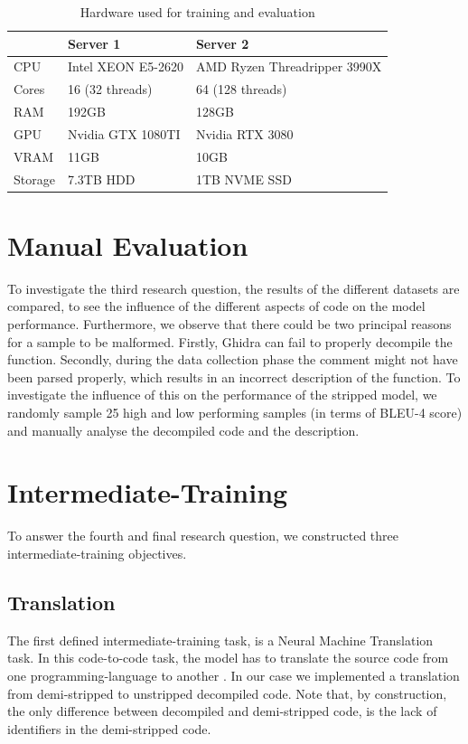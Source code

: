 \label{tab:server}
\begin{table}[!h]
\centering
\begin{tabular}{l|ll}
\hline
        & Server 1           & Server 2                     \\ \hline
CPU     & Intel XEON E5-2620 & AMD Ryzen Threadripper 3990X \\
Cores   & 16 (32 threads)    & 64 (128 threads)             \\
RAM     & 192GB              & 128GB                        \\
GPU     & Nvidia GTX 1080TI  & Nvidia RTX 3080              \\
VRAM    & 11GB               & 10GB                         \\
Storage & 7.3TB HDD          & 1TB NVME SSD                
\end{tabular}
\caption{Hardware used for training and evaluation}
\end{table}

\section{Manual Evaluation}
To investigate the third research question, the results of the different datasets are compared, to see the influence of the different aspects of code on the model performance. Furthermore, we observe that there could be two principal reasons for a sample to be malformed. Firstly, Ghidra can fail to properly decompile the function. Secondly, during the data collection phase the comment might not have been parsed properly, which results in an incorrect description of the function. To investigate the influence of this on the performance of the stripped model, we randomly sample 25 high and low performing samples (in terms of BLEU-4 score) and manually analyse the decompiled code and the description. 

\section{Intermediate-Training}

To answer the fourth and final research question, we constructed three intermediate-training objectives.

\subsection{Translation}
The first defined intermediate-training task, is a Neural Machine Translation task. In this code-to-code task, the model has to translate the source code from one programming-language to another \cite{CodeXGlue}. 
In our case we implemented a translation from demi-stripped to unstripped decompiled code. Note that, by construction, the only difference between decompiled and demi-stripped code, is the lack of identifiers in the demi-stripped code.

